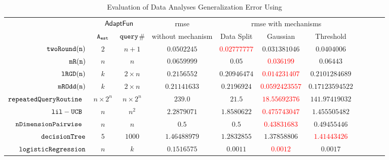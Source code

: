 {\footnotesize
\begin {table}[H]
        \vspace{-0.2cm}
        \caption{Evaluation of Data Analyses Generalization Error Using {\THESYSTEM}}
    \vspace{-0.2cm}
        \label{tb:adapt-generalization}
        \begin{center}
        \centering
{\tiny
        \begin{tabular}{| >{\tiny}r | c | c | c | c | c | c | c | c | c | c  }
         \hline \hline
        \multirow{2}{*}{Program $c$}
         & \multicolumn{2}{c|}{$\textsf{AdaptFun}$}
         & {rmse}
         & \multicolumn{3}{c|}{rmse with mechanisms} \\ 
         \cline{2-3} \cline{5-7}
         & {${\mathtt{A_{est}}}$ } & {${\tt query}$\# } &  without mechanism & Data Split & Gaussian & Threshold  \\ 
         \cline{6-7}
         \hline \hline
         $  \mathtt{ twoRound(n) }$ & $ 2 $ & $  n + 1 $ & $0.0502245$   & \textcolor{red}{$0.02777777$} & {$0.031381046$} & $0.0404006$  \\
         $  \mathtt{ mR(n) }$ & $ n $ & $  n  $ & $0.0659999$   & $0.05$ & \textcolor{red}{$0.036199$} & $0.06443$  \\
         $  \mathtt{ lRGD(n) }$ & $ k $ & $  2\times n $ & $0.2156552$   & $0.20946474$ & \textcolor{red}{$0.014231407$} & $0.2101284689$  \\
         $  \mathtt{ mROdd(n) }$ & $ k $ & $  2 \times n $ & $0.21141633$   & $0.2196924$ & \textcolor{red}{$0.0592423557$} & $0.17123594522$  \\
         $\mathtt{repeatedQueryRoutine}$~\cite{Jamieson2015TheAO} & $ n \times 2^n $ & $  n \times 2^n $ & $239.0$   & $21.5$ & \textcolor{red}{$18.55692376$} & $141.97419032$  \\
         $\mathtt{lil-UCB}$~\cite{Jamieson2015TheAO} & $ n $ & $  n^2 $ & $ 2.2879071$   & $ 1.8580622$ & \textcolor{red}{$0.475743047$} & $ 1.455505482 $  \\
         $\mathtt{nDimensionPairwise}$~\cite{Jamieson2015TheAO} & $ n $ & $  n  $ & $0.5$   & $0.5$ & \textcolor{red}{$ 0.43831683 $} & {$0.49455446$}  \\
         $\mathtt{decisionTree}$ & $5$ &  $1000$ & $ 1.46488979 $  & $ 1.2832855 $ & $ 1.37858806 $ & \textcolor{red}{$1.41443426 $}  \\
         $  \mathtt{logisticRegression}$ & $n$ &  $k$ & $ 0.1516575 $  &  $ 0.0011 $ & \textcolor{red}{$0.0012$} & {$0.0017$}   \\

\end{tabular}}
\end{center}
\end{table}}
